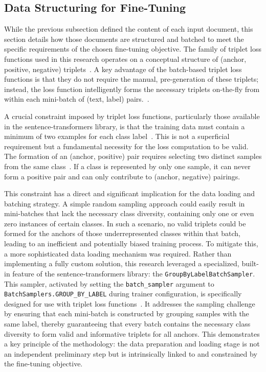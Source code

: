 \subsection{Data Structuring for Fine-Tuning}\label{ss:datastructure}
While the previous subsection defined the content of each input document, this section details how those documents are structured and batched to meet the specific requirements of the chosen fine-tuning objective. The family of triplet loss functions used in this research operates on a conceptual structure of (anchor, positive, negative) triplets~\cite{reimers-2019-sentence-bert,sbertLossOverview}. A key advantage of the batch-based triplet loss functions is that they do not require the manual, pre-generation of these triplets; instead, the loss function intelligently forms the necessary triplets on-the-fly from within each mini-batch of (text, label) pairs.~\cite{sbertLossOverview}.

A crucial constraint imposed by triplet loss functions, particularly those available in the sentence-transformers library, is that the training data must contain a minimum of two examples for each class label~\cite{sbertLosses}. This is not a superficial requirement but a fundamental necessity for the loss computation to be valid. The formation of an (anchor, positive) pair requires selecting two distinct samples from the same class~\cite{sbertLosses}. If a class is represented by only one sample, it can never form a positive pair and can only contribute to (anchor, negative) pairings.

This constraint has a direct and significant implication for the data loading and batching strategy. A simple random sampling approach could easily result in mini-batches that lack the necessary class diversity, containing only one or even zero instances of certain classes. In such a scenario, no valid triplets could be formed for the anchors of those underrepresented classes within that batch, leading to an inefficient and potentially biased training process. To mitigate this, a more sophisticated data loading mechanism was required. Rather than implementing a fully custom solution, this research leveraged a specialized, built-in feature of the sentence-transformers library: the \verb|GroupByLabelBatchSampler|. This sampler, activated by setting the \verb|batch_sampler| argument to \verb|BatchSamplers.GROUP_BY_LABEL| during trainer configuration, is specifically designed for use with triplet loss functions~\cite{sbertSamplers}. It addresses the sampling challenge by ensuring that each mini-batch is constructed by grouping samples with the same label, thereby guaranteeing that every batch contains the necessary class diversity to form valid and informative triplets for all anchors. This demonstrates a key principle of the methodology: the data preparation and loading stage is not an independent preliminary step but is intrinsically linked to and constrained by the fine-tuning objective.

